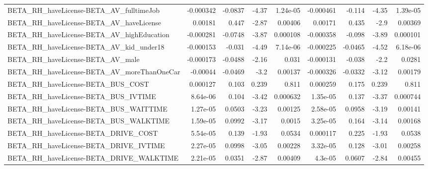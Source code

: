 \begin{tabular}{lrrrrrrrr}
BETA\_RH\_haveLicense-BETA\_AV\_fulltimeJob            &   -0.000342 &      -0.0837 &     -4.37 & 1.24e-05 &  -0.000461 &      -0.114 &        -4.35 &      1.39e-05 \\
BETA\_RH\_haveLicense-BETA\_AV\_haveLicense            &     0.00181 &        0.447 &     -2.87 &  0.00406 &    0.00171 &       0.435 &         -2.9 &       0.00369 \\
BETA\_RH\_haveLicense-BETA\_AV\_highEducation          &   -0.000281 &      -0.0748 &     -3.87 & 0.000108 &  -0.000358 &      -0.098 &        -3.89 &      0.000101 \\
BETA\_RH\_haveLicense-BETA\_AV\_kid\_under18            &   -0.000153 &       -0.031 &     -4.49 & 7.14e-06 &  -0.000225 &     -0.0465 &        -4.52 &      6.18e-06 \\
BETA\_RH\_haveLicense-BETA\_AV\_male                   &   -0.000173 &      -0.0488 &     -2.16 &    0.031 &  -0.000131 &      -0.038 &         -2.2 &        0.0281 \\
BETA\_RH\_haveLicense-BETA\_AV\_moreThanOneCar         &    -0.00044 &      -0.0469 &      -3.2 &  0.00137 &  -0.000326 &     -0.0332 &        -3.12 &       0.00179 \\
BETA\_RH\_haveLicense-BETA\_BUS\_COST                  &    0.000127 &        0.103 &     0.239 &    0.811 &   0.000259 &       0.175 &        0.239 &         0.811 \\
BETA\_RH\_haveLicense-BETA\_BUS\_IVTIME                &    8.64e-06 &        0.104 &     -3.42 & 0.000632 &   1.35e-05 &       0.137 &        -3.37 &      0.000744 \\
BETA\_RH\_haveLicense-BETA\_BUS\_WAITTIME              &    1.27e-05 &       0.0503 &     -3.23 &  0.00125 &   2.58e-05 &      0.0958 &        -3.19 &       0.00141 \\
BETA\_RH\_haveLicense-BETA\_BUS\_WALKTIME              &    1.59e-05 &       0.0992 &     -3.17 &   0.0015 &   3.25e-05 &       0.164 &        -3.14 &       0.00168 \\
BETA\_RH\_haveLicense-BETA\_DRIVE\_COST                &    5.54e-05 &        0.139 &     -1.93 &   0.0534 &   0.000117 &       0.225 &        -1.93 &        0.0538 \\
BETA\_RH\_haveLicense-BETA\_DRIVE\_IVTIME              &    2.27e-05 &       0.0998 &     -3.05 &  0.00228 &   3.32e-05 &       0.128 &        -3.01 &       0.00258 \\
BETA\_RH\_haveLicense-BETA\_DRIVE\_WALKTIME            &    2.21e-05 &       0.0351 &     -2.87 &  0.00409 &    4.3e-05 &      0.0607 &        -2.84 &       0.00455 \\

\end{tabular}
